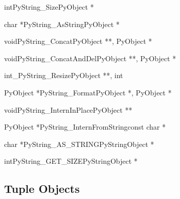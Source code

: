 \documentclass[twoside,openright]{report}
\begin{document}
\begin{cfuncdesc}{int}{PyString_Size}{PyObject *}

\end{cfuncdesc}

\begin{cfuncdesc}{char *}{PyString_AsString}{PyObject *}

\end{cfuncdesc}

\begin{cfuncdesc}{void}{PyString_Concat}{PyObject **, PyObject *}

\end{cfuncdesc}

\begin{cfuncdesc}{void}{PyString_ConcatAndDel}{PyObject **, PyObject *}

\end{cfuncdesc}

\begin{cfuncdesc}{int}{_PyString_Resize}{PyObject **, int}

\end{cfuncdesc}

\begin{cfuncdesc}{PyObject *}{PyString_Format}{PyObject *, PyObject *}

\end{cfuncdesc}

\begin{cfuncdesc}{void}{PyString_InternInPlace}{PyObject **}

\end{cfuncdesc}

\begin{cfuncdesc}{PyObject *}{PyString_InternFromString}{const char *}

\end{cfuncdesc}

\begin{cfuncdesc}{char *}{PyString_AS_STRING}{PyStringObject *}

\end{cfuncdesc}

\begin{cfuncdesc}{int}{PyString_GET_SIZE}{PyStringObject *}

\end{cfuncdesc}


\subsection{Tuple Objects}
\end{document}
